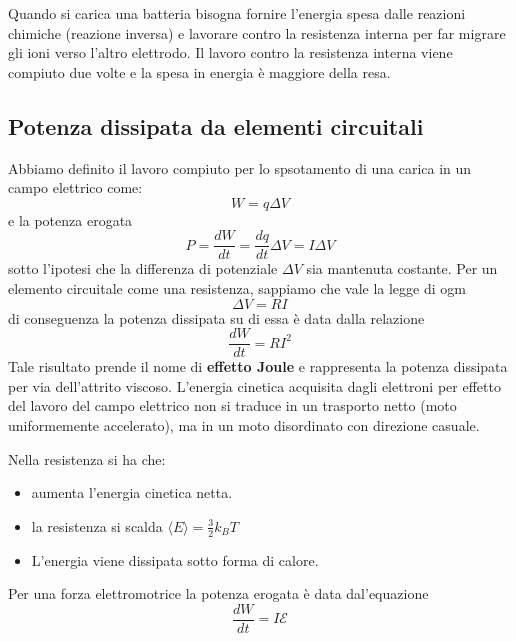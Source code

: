 Quando si carica una batteria bisogna fornire l'energia spesa dalle reazioni chimiche (reazione inversa) e lavorare contro la resistenza interna per far migrare gli ioni verso l'altro elettrodo. Il lavoro contro la resistenza interna viene compiuto due volte e la spesa in energia \`e maggiore della resa.

\subsection{Potenza dissipata da elementi circuitali}

Abbiamo definito il lavoro compiuto per lo spsotamento di una carica in un campo elettrico come: 
\begin{equation*}
	W  = q\Delta V
\end{equation*}
e la potenza erogata 
\begin{equation*}
	P = \frac{dW}{dt} = \frac{dq}{dt} \Delta V = I \Delta V
\end{equation*}
sotto l'ipotesi che la differenza di potenziale $\Delta V$ sia mantenuta costante. Per un elemento circuitale come una resistenza, sappiamo che vale la legge di ogm 
\begin{equation*}
	\Delta V = RI
\end{equation*}
di conseguenza la potenza dissipata su di essa \`e data dalla relazione
\begin{equation}
	\frac{dW}{dt}= RI^2
\end{equation}
Tale risultato prende il nome di \textbf{effetto Joule} e rappresenta la potenza dissipata per via dell'attrito viscoso. L'energia cinetica acquisita dagli elettroni per effetto del lavoro del campo elettrico non si traduce in un trasporto netto (moto uniformemente accelerato), ma in un moto disordinato con direzione casuale.

Nella resistenza si ha che:
\begin{itemize}
	\item aumenta l'energia cinetica netta.
	\item la resistenza si scalda $\langle E\rangle  = \frac{3}{2}k_{B}T $
	\item L'energia viene dissipata sotto forma di calore. 
\end{itemize}
Per una forza elettromotrice la potenza erogata \`e data dal'equazione
\begin{equation*}
	\frac{dW}{dt}= I \mathcal{E}
\end{equation*}
\newpage

